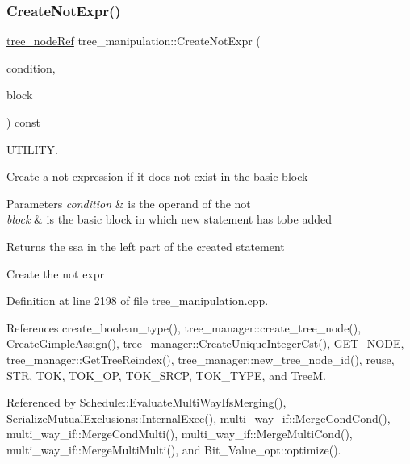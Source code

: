 \subsubsection{\texorpdfstring{Create\+Not\+Expr()}{CreateNotExpr()}}
{\footnotesize\ttfamily \hyperlink{tree__node_8hpp_a6ee377554d1c4871ad66a337eaa67fd5}{tree\+\_\+node\+Ref} tree\+\_\+manipulation\+::\+Create\+Not\+Expr (\begin{DoxyParamCaption}\item[{const \hyperlink{tree__node_8hpp_a3cf5d02292c940f3892425a5b5fdec3c}{tree\+\_\+node\+Const\+Ref} \&}]{condition,  }\item[{const bloc\+Ref \&}]{block }\end{DoxyParamCaption}) const}



U\+T\+I\+L\+I\+TY. 

Create a not expression if it does not exist in the basic block 
\begin{DoxyParams}{Parameters}
{\em condition} & is the operand of the not \\
\hline
{\em block} & is the basic block in which new statement has tobe added \\
\hline
\end{DoxyParams}
\begin{DoxyReturn}{Returns}
the ssa in the left part of the created statement 
\end{DoxyReturn}
Create the not expr 

Definition at line 2198 of file tree\+\_\+manipulation.\+cpp.



References create\+\_\+boolean\+\_\+type(), tree\+\_\+manager\+::create\+\_\+tree\+\_\+node(), Create\+Gimple\+Assign(), tree\+\_\+manager\+::\+Create\+Unique\+Integer\+Cst(), G\+E\+T\+\_\+\+N\+O\+DE, tree\+\_\+manager\+::\+Get\+Tree\+Reindex(), tree\+\_\+manager\+::new\+\_\+tree\+\_\+node\+\_\+id(), reuse, S\+TR, T\+OK, T\+O\+K\+\_\+\+OP, T\+O\+K\+\_\+\+S\+R\+CP, T\+O\+K\+\_\+\+T\+Y\+PE, and TreeM.



Referenced by Schedule\+::\+Evaluate\+Multi\+Way\+Ifs\+Merging(), Serialize\+Mutual\+Exclusions\+::\+Internal\+Exec(), multi\+\_\+way\+\_\+if\+::\+Merge\+Cond\+Cond(), multi\+\_\+way\+\_\+if\+::\+Merge\+Cond\+Multi(), multi\+\_\+way\+\_\+if\+::\+Merge\+Multi\+Cond(), multi\+\_\+way\+\_\+if\+::\+Merge\+Multi\+Multi(), and Bit\+\_\+\+Value\+\_\+opt\+::optimize().

